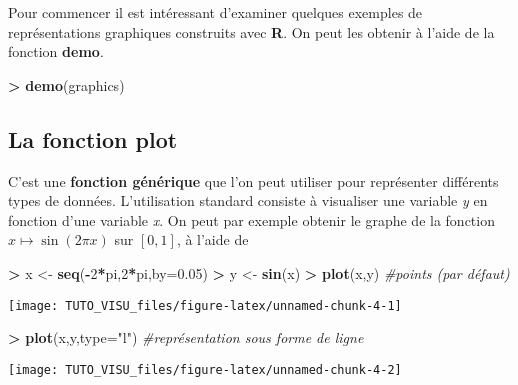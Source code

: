 \documentclass[]{book}
\newenvironment{Shaded}{\begin{snugshade}}{\end{snugshade}}
\newcommand{\CommentTok}[1]{\textcolor[rgb]{0.56,0.35,0.01}{\textit{#1}}}
\newcommand{\DataTypeTok}[1]{\textcolor[rgb]{0.13,0.29,0.53}{#1}}
\newcommand{\DecValTok}[1]{\textcolor[rgb]{0.00,0.00,0.81}{#1}}
\newcommand{\FloatTok}[1]{\textcolor[rgb]{0.00,0.00,0.81}{#1}}
\newcommand{\KeywordTok}[1]{\textcolor[rgb]{0.13,0.29,0.53}{\textbf{#1}}}
\newcommand{\NormalTok}[1]{#1}
\newcommand{\OperatorTok}[1]{\textcolor[rgb]{0.81,0.36,0.00}{\textbf{#1}}}
\newcommand{\StringTok}[1]{\textcolor[rgb]{0.31,0.60,0.02}{#1}}
\theoremstyle{definition}
\theoremstyle{definition}
\theoremstyle{definition}
\theoremstyle{remark}
\begin{document}
Pour commencer il est intéressant d'examiner quelques exemples de représentations graphiques construits avec \textbf{R}. On peut les obtenir à l'aide de la fonction \textbf{demo}.

\begin{Shaded}
\begin{Highlighting}[]
\OperatorTok{>}\StringTok{ }\KeywordTok{demo}\NormalTok{(graphics)}
\end{Highlighting}
\end{Shaded}

\hypertarget{la-fonction-plot}{%
\subsection{\texorpdfstring{La fonction \textbf{plot}}{La fonction plot}}\label{la-fonction-plot}}

C'est une \textbf{fonction générique} que l'on peut utiliser pour représenter différents types de données. L'utilisation standard consiste à visualiser une variable \emph{y} en fonction d'une variable \emph{x}. On peut par exemple obtenir le graphe de la fonction \(x\mapsto \sin(2\pi x)\) sur \([0,1]\), à l'aide de

\begin{Shaded}
\begin{Highlighting}[]
\OperatorTok{>}\StringTok{ }\NormalTok{x <-}\StringTok{ }\KeywordTok{seq}\NormalTok{(}\OperatorTok{-}\DecValTok{2}\OperatorTok{*}\NormalTok{pi,}\DecValTok{2}\OperatorTok{*}\NormalTok{pi,}\DataTypeTok{by=}\FloatTok{0.05}\NormalTok{)}
\OperatorTok{>}\StringTok{ }\NormalTok{y <-}\StringTok{ }\KeywordTok{sin}\NormalTok{(x)}
\OperatorTok{>}\StringTok{ }\KeywordTok{plot}\NormalTok{(x,y) }\CommentTok{#points (par défaut)}
\end{Highlighting}
\end{Shaded}

\begin{center}\texttt{[image: TUTO\_VISU\_files/figure-latex/unnamed-chunk-4-1]} \end{center}

\begin{Shaded}
\begin{Highlighting}[]
\OperatorTok{>}\StringTok{ }\KeywordTok{plot}\NormalTok{(x,y,}\DataTypeTok{type=}\StringTok{"l"}\NormalTok{) }\CommentTok{#représentation sous forme de ligne}
\end{Highlighting}
\end{Shaded}

\begin{center}\texttt{[image: TUTO\_VISU\_files/figure-latex/unnamed-chunk-4-2]} \end{center}
\end{document}
